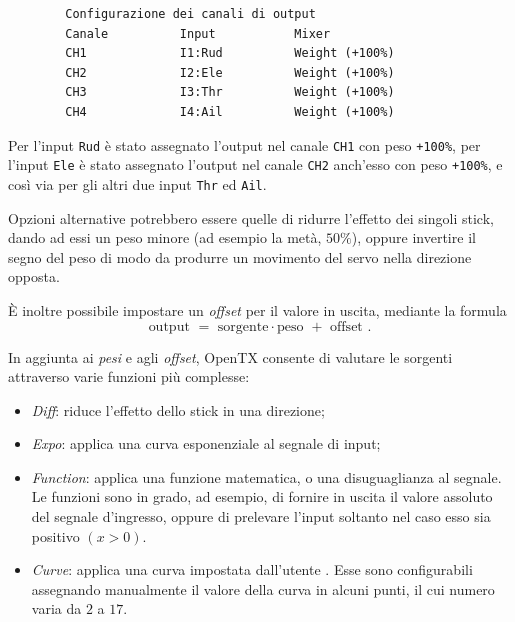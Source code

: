 \documentclass[a4paper, 12pt]{report}
\begin{document}
\begin{lstlisting}
        Configurazione dei canali di output
        Canale          Input           Mixer
        CH1             I1:Rud          Weight (+100%)
        CH2             I2:Ele          Weight (+100%)
        CH3             I3:Thr          Weight (+100%)
        CH4             I4:Ail          Weight (+100%)
\end{lstlisting}

Per l'input \texttt{Rud} è stato assegnato l'output nel canale \texttt{CH1} con peso \texttt{+100\%}, per l'input \texttt{Ele} è stato assegnato l'output nel canale \texttt{CH2} anch'esso con peso \texttt{+100\%}, e così via per gli altri due input \texttt{Thr} ed \texttt{Ail}.

Opzioni alternative potrebbero essere quelle di ridurre l'effetto dei singoli stick, dando ad essi un peso minore (ad esempio la metà, $50\%$), oppure invertire il segno del peso di modo da produrre un movimento del servo nella direzione opposta.

È inoltre possibile impostare un \emph{offset} per il valore in uscita, mediante la formula
$$\mbox{output } = \mbox{ sorgente} \cdot \mbox{peso } + \mbox{ offset }.$$

In aggiunta ai \emph{pesi} e agli \emph{offset}, OpenTX consente di valutare le sorgenti attraverso varie funzioni più complesse:
\begin{itemize}
        \item \emph{Diff}: riduce l'effetto dello stick in una direzione;
        \item \emph{Expo}: applica una curva esponenziale al segnale di input;
        \item \emph{Function}: applica una funzione matematica, o una disuguaglianza al segnale. Le funzioni sono in grado, ad esempio, di fornire in uscita il valore assoluto del segnale d'ingresso, oppure di prelevare l'input soltanto nel caso esso sia positivo $(x>0)$.
        \item \emph{Curve}: applica una curva impostata dall'utente \cite{opentx-curves}. Esse sono configurabili assegnando manualmente il valore della curva in alcuni punti, il cui numero varia da $2$ a $17$.
\end{itemize}
\end{document}
